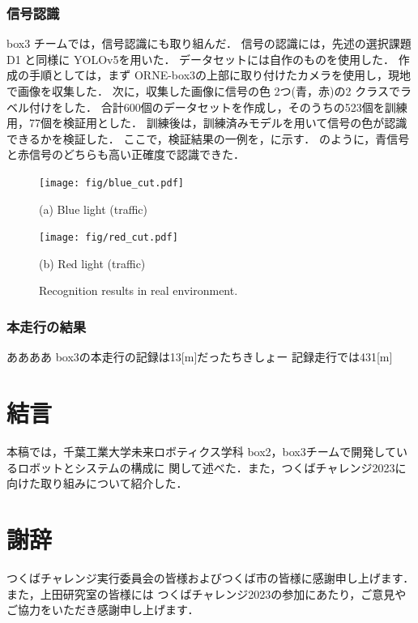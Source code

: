 \documentclass[twocolumn, 9pt]{jsproceedings}
\begin{document}
\subsubsection{信号認識}
box3 チームでは，信号認識にも取り組んだ．
信号の認識には，先述の選択課題 D1 と同様に YOLOv5を用いた．
データセットには自作のものを使用した．
作成の手順としては，まず ORNE-box3の上部に取り付けたカメラを使用し，現地で画像を収集した．
次に，収集した画像に信号の色 2つ(青，赤)の2 クラスでラベル付けをした．
合計600個のデータセットを作成し，そのうちの523個を訓練用，77個を検証用とした．
訓練後は，訓練済みモデルを用いて信号の色が認識できるかを検証した．
ここで，検証結果の一例を，に示す．
のように，青信号と赤信号のどちらも高い正確度で認識できた．


\begin{figure}[h!]
  \begin{minipage}[t]{0.47\linewidth}
    \centering
    \texttt{[image: fig/blue\_cut.pdf]}
    \caption*{(a) Blue light (traffic)}
  \end{minipage}
  \hspace*{2mm}
  \begin{minipage}[t]{0.47\linewidth}
    \centering
    \texttt{[image: fig/red\_cut.pdf]}
    \caption*{(b) Red light (traffic)}
  \end{minipage}%
  \caption{Recognition results in real environment.}
\end{figure}

\subsubsection{本走行の結果}
ああああ
box3の本走行の記録は13[m]だったちきしょー
記録走行では431[m]



\section{結言}
本稿では，千葉工業大学未来ロボティクス学科 box2，box3チームで開発しているロボットとシステムの構成に
関して述べた．また，つくばチャレンジ2023に向けた取り組みについて紹介した．\\

\section*{謝辞}
つくばチャレンジ実行委員会の皆様およびつくば市の皆様に感謝申し上げます．また，上田研究室の皆様には
つくばチャレンジ2023の参加にあたり，ご意見やご協力をいただき感謝申し上げます．\\
\end{document}
